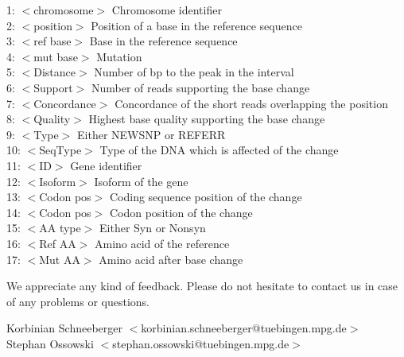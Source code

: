 \documentclass[a4paper,10pt]{scrartcl}
\begin{document}
1: $<$chromosome$>$ Chromosome identifier\\
2: $<$position$>$ Position of a base in the reference sequence\\
3: $<$ref base$>$ Base in the reference sequence\\
4: $<$mut base$>$ Mutation\\
5: $<$Distance$>$ Number of bp to the peak in the interval\\
6: $<$Support$>$ Number of reads supporting the base change\\
7: $<$Concordance$>$ Concordance of the short reads overlapping the position\\
8: $<$Quality$>$ Highest base quality supporting the base change\\
9: $<$Type$>$ Either NEWSNP or REFERR\\
10: $<$SeqType$>$ Type of the DNA which is affected of the change\\
11: $<$ID$>$ Gene identifier\\
12: $<$Isoform$>$ Isoform of the gene\\
13: $<$Codon pos$>$ Coding sequence position of the change\\
14: $<$Codon pos$>$ Codon position of the change\\
15: $<$AA type$>$ Either Syn or Nonsyn\\
16: $<$Ref AA$>$ Amino acid of the reference\\
17: $<$Mut AA$>$ Amino acid after base change\\

\newpage

We appreciate any kind of feedback.
Please do not hesitate to contact us in case of any problems or questions.

Korbinian Schneeberger $<$korbinian.schneeberger@tuebingen.mpg.de$>$\\
Stephan Ossowski $<$stephan.ossowski@tuebingen.mpg.de$>$\\
\end{document}
